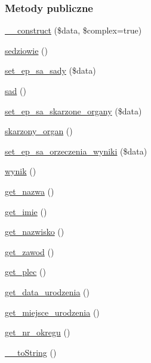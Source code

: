 \subsubsection*{Metody publiczne}
\begin{DoxyCompactItemize}
\item 
\hyperlink{classep___s_a___orzeczenie_a8c384d5e0f13f64cbf8c51096faa7738}{\-\_\-\-\_\-construct} (\$data, \$complex=true)
\item 
\hyperlink{classep___s_a___orzeczenie_a8a15d60da65e02bae2cbdbf37b916e9f}{sedziowie} ()
\item 
\hyperlink{classep___s_a___orzeczenie_ad89dcca53362d835ea728d79a7ef4161}{set\-\_\-ep\-\_\-sa\-\_\-sady} (\$data)
\item 
\hyperlink{classep___s_a___orzeczenie_a975f85bebff72c666d5edbcda34b71f2}{sad} ()
\item 
\hyperlink{classep___s_a___orzeczenie_a09fc5ad08f45ee935307eaf11ae3223d}{set\-\_\-ep\-\_\-sa\-\_\-skarzone\-\_\-organy} (\$data)
\item 
\hyperlink{classep___s_a___orzeczenie_a04a204d329b613d36ca895102f98e42e}{skarzony\-\_\-organ} ()
\item 
\hyperlink{classep___s_a___orzeczenie_af21ad6bed19b284eec64bbf92d0cd688}{set\-\_\-ep\-\_\-sa\-\_\-orzeczenia\-\_\-wyniki} (\$data)
\item 
\hyperlink{classep___s_a___orzeczenie_a4fc8dd9c4cd638f3254e1cd146211b7d}{wynik} ()
\item 
\hyperlink{classep___s_a___orzeczenie_ac0818f0049d7b84f08f77128f54cee36}{get\-\_\-nazwa} ()
\item 
\hyperlink{classep___s_a___orzeczenie_ac4b0c85dc2a130038f2d118dbd0c3d77}{get\-\_\-imie} ()
\item 
\hyperlink{classep___s_a___orzeczenie_abdd1d7ff92508da7f748ba1feec97af0}{get\-\_\-nazwisko} ()
\item 
\hyperlink{classep___s_a___orzeczenie_af80ca8310b60004454dd02a387deaa2c}{get\-\_\-zawod} ()
\item 
\hyperlink{classep___s_a___orzeczenie_ac7f9af5c3fa024e4c26a7b6bd4ce4bb4}{get\-\_\-plec} ()
\item 
\hyperlink{classep___s_a___orzeczenie_a880b240cd2d8c336fd1709bf0cb1ae2c}{get\-\_\-data\-\_\-urodzenia} ()
\item 
\hyperlink{classep___s_a___orzeczenie_ac57c08ec5e394a19c5bd9280c8376182}{get\-\_\-miejsce\-\_\-urodzenia} ()
\item 
\hyperlink{classep___s_a___orzeczenie_a2645a9f0aa5b0ccc482943348c033d0a}{get\-\_\-nr\-\_\-okregu} ()
\item 
\hyperlink{classep___s_a___orzeczenie_a7516ca30af0db3cdbf9a7739b48ce91d}{\-\_\-\-\_\-to\-String} ()
\end{DoxyCompactItemize}
